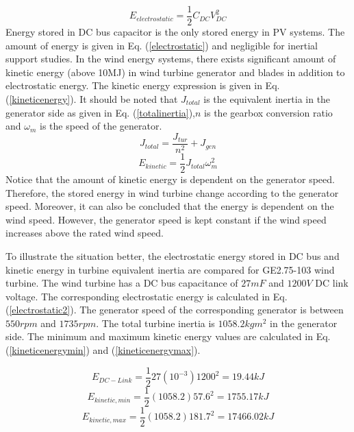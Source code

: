 \begin{equation}
E_{electrostatic}=\frac{1}{2} C_{DC}V_{DC}^{2}
\label{electrostatic}
\end{equation}
Energy stored in DC bus capacitor is the only stored energy in PV systems. The amount of energy is given in Eq. (\ref{electrostatic}) and negligible for inertial support studies. In the wind energy systems, there exists significant amount of kinetic energy (above 10MJ) in wind turbine generator and blades in addition to electrostatic energy. The kinetic energy expression is given in Eq. (\ref{kineticenergy}). It should be noted that $J_{total}$ is the equivalent inertia in the generator side as given in Eq. (\ref{totalinertia}),$n$ is the gearbox conversion ratio and $\omega_{m}$ is the speed of the generator.
\begin{equation}
J_{total}=\frac{J_{tur}}{n^{2}} + J_{gen}
\label{totalinertia}
\end{equation}
\begin{equation}
E_{kinetic}=\frac{1}{2} J_{total}\omega_{m}^{2}
\label{kineticenergy}
\end{equation}
Notice that the amount of kinetic energy is dependent on the generator speed. Therefore, the stored energy in wind turbine change according to the generator speed. Moreover, it can also be concluded that the energy is dependent on the wind speed. However, the generator speed is kept constant if the wind speed increases above the rated wind speed. \par
To illustrate the situation better, the electrostatic energy stored in DC bus and kinetic energy in turbine equivalent inertia are compared for GE2.75-103 wind turbine. The wind turbine has a DC bus capacitance of $27mF$ and $1200V$ DC link voltage. The corresponding electrostatic energy is calculated in Eq. (\ref{electrostatic2}). The generator speed of the corresponding generator is between $550rpm$ and $1735rpm$. The total turbine inertia is $1058.2 kgm^2$ in the generator side. The minimum and maximum kinetic energy values are calculated in Eq. (\ref{kineticenergymin}) and (\ref{kineticenergymax}). \par
\begin{equation}
E_{DC-Link}=\frac{1}{2} 27 (10^{-3}) 1200^{2}=19.44kJ
\label{electrostatic2}
\end{equation}
\begin{equation}
E_{kinetic,min}=\frac{1}{2} (1058.2) 57.6^{2}=1755.17kJ
\label{kineticenergymin}
\end{equation}
\begin{equation}
E_{kinetic,max}=\frac{1}{2} (1058.2) 181.7^{2}=17466.02kJ
\label{kineticenergymax}
\end{equation}
